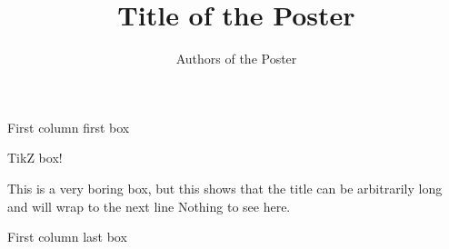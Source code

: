 \documentclass[a3,2col]{ostposter}
\title{Title of the Poster}
\author{Authors of the Poster}
\affiliation{Division..., Department..., University..., etc.}
\begin{document}
%
\begin{postercolumn}[0.3]
	\begin{posterbox}[posterblue]{First column first box}
		\lipsum[1]
	\end{posterbox}
	\begin{posterbox}[posteryellow]{TikZ box!}
	\end{posterbox}
	\begin{posterbox}[posterblue]{This is a very boring box, but this shows that the title can be arbitrarily long and will wrap to the next line}
		Nothing to see here.
	\end{posterbox}
	\begin{posterbox}{First column last box}
		\lipsum[2]
	\end{posterbox}
\end{postercolumn}
\end{document}
